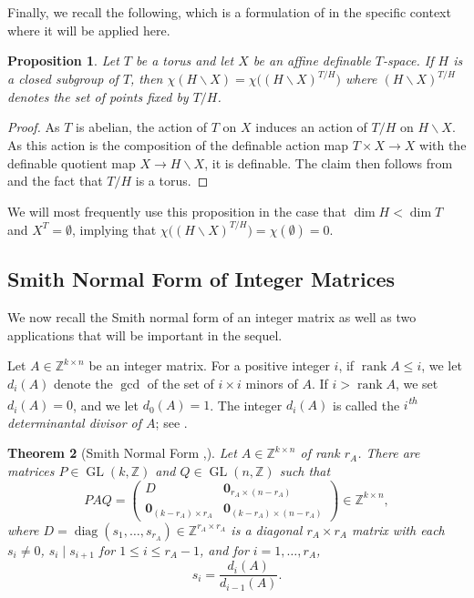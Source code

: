 \documentclass[twoside]{amsart}
\newtheorem{theorem}{Theorem}[section]
\newtheorem{proposition}[theorem]{Proposition}
\theoremstyle{definition}
\theoremstyle{remark}
\numberwithin{equation}{section}
\newcommand{\Z}{\mathbb{Z}}
\newcommand{\Rank}{\operatorname{rank}}
\newcommand{\diag}{\operatorname{diag}}
\newcommand{\bs}{\boldsymbol}
\newcommand{\GL}{\operatorname{GL}}
\begin{document}
Finally, we recall the following, which is a formulation of \cite[Thrm.~3.1]{FarsiMeitSeaton} in the specific context where it will be applied here.

\begin{proposition}
\label{prop:TorusActionSubgroupEC}
Let $T$ be a torus and let $X$ be an affine definable $T$-space. If $H$ is a closed subgroup of $T$,
then $\chi(H\backslash X) = \chi\big( (H\backslash X)^{T/H}\big)$ where $(H\backslash X)^{T/H}$ denotes the set of points
fixed by $T/H$.
\end{proposition}
\begin{proof}
As $T$ is abelian, the action of $T$ on $X$ induces an action of $T/H$ on $H\backslash X$. As this action is the
composition of the definable action map $T\times X\to X$ with the definable quotient map $X\to H\backslash X$, it is definable. The claim then follows from
\cite[Thrm.~3.1]{FarsiMeitSeaton} and the fact that $T/H$ is a torus.
\end{proof}

We will most frequently use this proposition in the case that $\dim H < \dim T$ and $X^T = \emptyset$,
implying that $\chi\big( (H\backslash X)^{T/H}\big) = \chi(\emptyset) = 0$.


\subsection{Smith Normal Form of Integer Matrices}
\label{subsec:BackSmith}

We now recall the Smith normal form of an integer matrix as well as two applications that will be important in the sequel.

Let $A\in\Z^{k\times n}$ be an integer matrix. For a positive integer $i$,
if $\Rank A \leq i$, we let $d_i(A)$ denote the $\gcd$ of the set of $i\times i$ minors of $A$.
If $i > \Rank A$, we set $d_i(A) = 0$, and we let $d_0(A) = 1$. The integer $d_i(A)$ is called the \emph{$i$\textsuperscript{th} determinantal divisor of $A$};
see \cite[Ch.5, Def.~3.10]{AdkinsWeintraub}.


\begin{theorem}[Smith Normal Form {\cite{SmithLinCongr},\cite[Ch.~5, Thrm.~3.1 and Lem.~3.11]{AdkinsWeintraub}}]
\label{thrm:SmithNormForm}
Let $A\in\Z^{k\times n}$ of rank $r_A$. There are matrices $P\in\GL(k,\Z)$ and $Q\in\GL(n,\Z)$ such that
\begin{equation}
\label{eq:SmithNormForm}
    PAQ =   \begin{pmatrix} D & \bs{0}_{r_A\times(n-r_A)} \\ \bs{0}_{(k-r_A)\times r_A} & \bs{0}_{(k-r_A)\times(n-r_A)} \end{pmatrix} \in\Z^{k\times n},
\end{equation}
where $D = \diag(s_1,\ldots,s_{r_A})\in\Z^{r_A\times r_A}$ is a diagonal $r_A\times r_A$ matrix with each $s_i\neq 0$,
$s_i\mid s_{i+1}$ for $1\leq i\leq r_A - 1$, and for $i = 1,\ldots, r_A$,
\[
    s_i =   \frac{d_i(A)}{d_{i-1}(A)}.
\]
\end{theorem}
\end{document}
